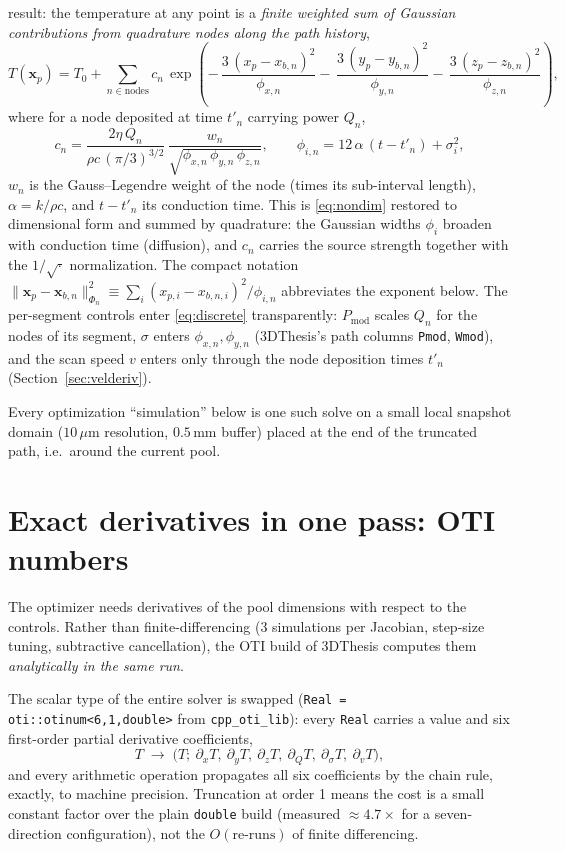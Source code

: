 \documentclass[11pt]{article}
\newcommand{\Pmod}{P_{\mathrm{mod}}}
\begin{document}
result: the temperature at any point is a \emph{finite weighted sum of
Gaussian contributions from quadrature nodes along the path history},
\begin{equation}
  T(\mathbf{x}_p) = T_0 + \sum_{n \in \text{nodes}}
     c_n\, \exp\!\left(
       -\,\frac{3\,(x_p - x_{b,n})^2}{\phi_{x,n}}
       -\,\frac{3\,(y_p - y_{b,n})^2}{\phi_{y,n}}
       -\,\frac{3\,(z_p - z_{b,n})^2}{\phi_{z,n}}
     \right),
  \label{eq:discrete}
\end{equation}
where for a node deposited at time $t'_n$ carrying power $Q_n$,
\begin{equation}
  c_n = \frac{2\eta\,Q_n}{\rho c\,(\pi/3)^{3/2}}\,
        \frac{w_n}{\sqrt{\phi_{x,n}\,\phi_{y,n}\,\phi_{z,n}}},
  \qquad
  \phi_{i,n} = 12\,\alpha\,(t - t'_n) + \sigma_i^2 ,
  \label{eq:cn}
\end{equation}
$w_n$ is the Gauss--Legendre weight of the node (times its sub-interval
length), $\alpha = k/\rho c$, and $t-t'_n$ its conduction time. This is
\eqref{eq:nondim} restored to dimensional form and summed by quadrature: the
Gaussian widths $\phi_i$ broaden with conduction time (diffusion), and $c_n$
carries the source strength together with the $1/\sqrt{\cdot}$ normalization.
The compact notation $\|\mathbf{x}_p-\mathbf{x}_{b,n}\|^2_{\Phi_n} \equiv
\sum_{i}(x_{p,i}-x_{b,n,i})^2/\phi_{i,n}$ abbreviates the exponent below. The
per-segment controls enter \eqref{eq:discrete} transparently: $\Pmod{}$ scales
$Q_n$ for the nodes of its segment, $\sigma$ enters $\phi_{x,n},\phi_{y,n}$
(3DThesis's path columns \texttt{Pmod}, \texttt{Wmod}), and the scan speed $v$
enters only through the node deposition times $t'_n$ (Section~\ref{sec:velderiv}).

Every optimization ``simulation'' below is one such solve on a small local
snapshot domain ($10\,\mu$m resolution, $0.5$\,mm buffer) placed at the end
of the truncated path, i.e.\ around the current pool.

\section{Exact derivatives in one pass: OTI numbers}
\label{sec:oti}

The optimizer needs derivatives of the pool dimensions with respect to the
controls. Rather than finite-differencing (3 simulations per Jacobian,
step-size tuning, subtractive cancellation), the OTI build of 3DThesis
computes them \emph{analytically in the same run}.

The scalar type of the entire solver is swapped
(\texttt{Real = oti::otinum<6,1,double>} from \texttt{cpp\_oti\_lib}): every
\texttt{Real} carries a value and six first-order partial derivative
coefficients,
\[
  T \;\longrightarrow\;
  \bigl(T;\ \partial_x T,\ \partial_y T,\ \partial_z T,\ \partial_Q T,\ \partial_\sigma T,\ \partial_v T\bigr),
\]
and every arithmetic operation propagates all six coefficients by the chain
rule, exactly, to machine precision. Truncation at order 1 means the cost is
a small constant factor over the plain \texttt{double} build (measured
$\approx 4.7\times$ for a seven-direction configuration), not the
$O(\text{re-runs})$ of finite differencing.
\end{document}
